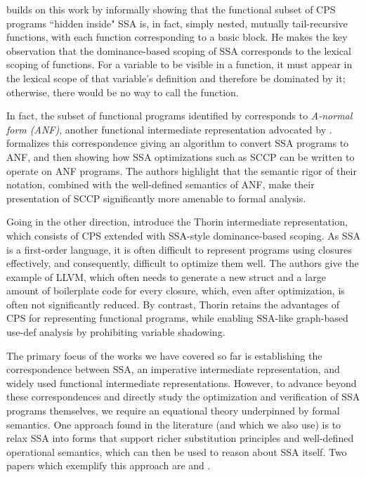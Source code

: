 \documentclass[acmsmall,screen,review]{acmart}
\begin{document}
\citet{appel-ssa} builds on this work by informally showing that the functional subset of CPS
programs ``hidden inside" SSA is, in fact, simply nested, mutually tail-recursive functions,
with each function corresponding to a basic block. He makes the key observation that the
dominance-based scoping of SSA corresponds to the lexical scoping of functions. For a variable to be
visible in a function, it must appear in the lexical scope of that variable's definition and
therefore be dominated by it; otherwise, there would be no way to call the function.

In fact, the subset of functional programs identified by \citet{appel-ssa} corresponds to
\emph{A-normal form (ANF)}, another functional intermediate representation advocated by
\citet{flanagan-93-anf}. \citet{chakravarty-functional-ssa-2003} formalizes this correspondence
giving an algorithm to convert SSA programs to ANF, and then showing how SSA optimizations such as
SCCP can be written to operate on ANF programs. The authors highlight that the semantic rigor of
their notation, combined with the well-defined semantics of ANF, make their presentation of SCCP
significantly more amenable to formal analysis.

Going in the other direction, \citet{thorin-12} introduce the Thorin intermediate representation,
which consists of CPS extended with SSA-style dominance-based scoping. As SSA is a first-order
language, it is often difficult to represent programs using closures effectively, and consequently,
difficult to optimize them well. The authors give the example of LLVM, which often needs to generate
a new struct and a large amount of boilerplate code for every closure, which, even after
optimization, is often not significantly reduced. By contrast, Thorin retains the advantages of CPS
for representing functional programs, while enabling SSA-like graph-based use-def analysis by
prohibiting variable shadowing.

The primary focus of the works we have covered so far is establishing the correspondence between
SSA, an imperative intermediate representation, and widely used functional intermediate
representations. However, to advance beyond these correspondences and directly study the
optimization and verification of SSA programs themselves, we require an equational theory
underpinned by formal semantics. One approach found in the literature (and which we also use) is
to relax SSA into forms that support richer substitution principles and well-defined operational
semantics, which can then be used to reason about SSA itself. Two papers which exemplify this
approach are \citet{benton-kennedy-99} and \citet{garbuzov-structural-cfg-2018}.
\end{document}
